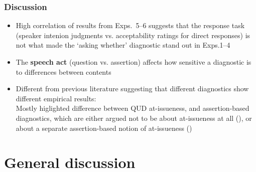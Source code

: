 \documentclass[compress, xcolor = dvipsnames, aspectratio=169]{beamer}
\begin{document}
	\begin{frame}\frametitle{Discussion}
		
		\begin{itemize}[<+->]
			\item High correlation of results from Exps.~5–6 suggests that the response task (speaker intenion judgments vs. acceptability ratings for direct responses) is not what made the `asking whether' diagnostic stand out in Exps.1–4

			\item The \textbf{speech act} (question vs. assertion) affects how sensitive a diagnostic is to differences between contents
			\item Different from previous literature suggesting that different diagnostics show different empirical results:\\
			Mostly higlighted difference between QUD at-issueness, and assertion-based diagnostics, which are either argued not to be about at-issueness at all
			(\citealt{snider_anaphoric_2017,snider_at-issuenessne_2017,snider_distinguishing_2018}), or about a separate assertion-based notion of at-issueness (\citealt{koev_notions_2018,faller_discourse_2019,korotkova_evidential_2020})
		\end{itemize} 

	\end{frame}	

\section{General discussion}
\end{document}
